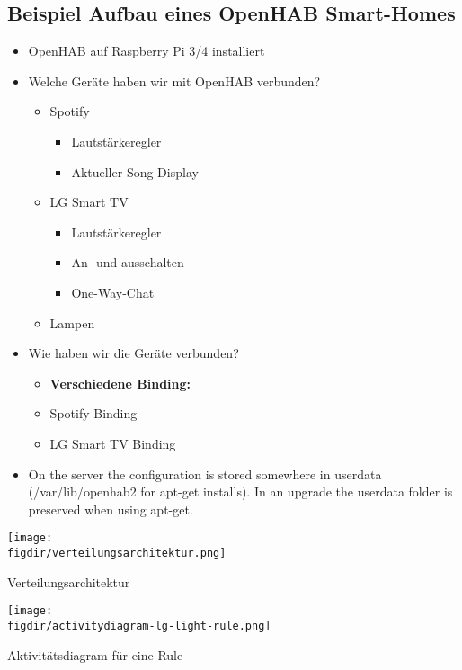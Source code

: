 \subsection{Beispiel Aufbau eines OpenHAB Smart-Homes}
\begin{itemize}
	\item OpenHAB auf Raspberry Pi 3/4 installiert
	\item Welche Geräte haben wir mit OpenHAB verbunden?
	\begin{itemize}
		\item Spotify
		\begin{itemize}
			\item Lautstärkeregler
			\item Aktueller Song Display
		\end{itemize}
		\item LG Smart TV
		\begin{itemize}
			\item Lautstärkeregler
			\item An- und ausschalten
			\item One-Way-Chat
		\end{itemize}
		\item Lampen
	\end{itemize}
	\item Wie haben wir die Geräte verbunden?
	\begin{itemize}
		\item \textbf{Verschiedene Binding:}
		\item Spotify Binding
		\item LG Smart TV Binding
	\end{itemize}
	\item On the server the configuration is stored somewhere in userdata (/var/lib/openhab2 for apt-get installs).
	In an upgrade the userdata folder is preserved when using apt-get.
\end{itemize}
\begin{minipage}{\textwidth}
	\centering
	\captionsetup{type=figure}
	\texttt{[image: \\figdir/verteilungsarchitektur.png]}
	\caption{Verteilungsarchitektur \label{fig:verteilungs-architektur}}
\end{minipage}
\begin{minipage}{\textwidth}
	\centering
	\captionsetup{type=figure}
	\texttt{[image: \\figdir/activitydiagram-lg-light-rule.png]}
	\caption{Aktivitätsdiagram für eine Rule \label{fig:activity-diagram}}
\end{minipage}

